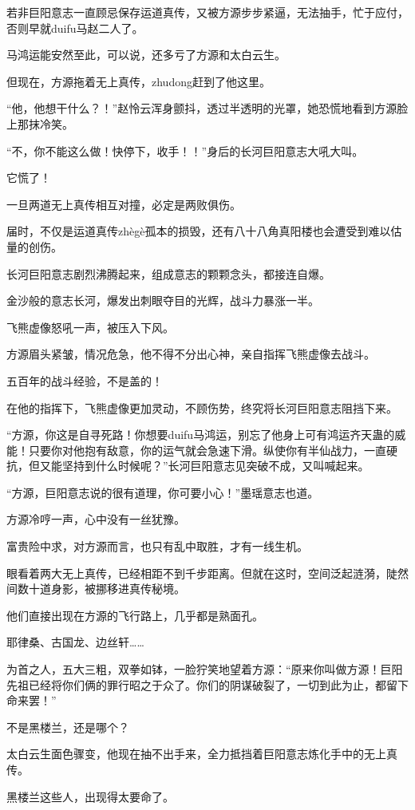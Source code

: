 \begin{this_body}
若非巨阳意志一直顾忌保存运道真传，又被方源步步紧逼，无法抽手，忙于应付，否则早就duifu马赵二人了。

马鸿运能安然至此，可以说，还多亏了方源和太白云生。

但现在，方源拖着无上真传，zhudong赶到了他这里。

“他，他想干什么？！”赵怜云浑身颤抖，透过半透明的光罩，她恐慌地看到方源脸上那抹冷笑。

“不，你不能这么做！快停下，收手！！”身后的长河巨阳意志大吼大叫。

它慌了！

一旦两道无上真传相互对撞，必定是两败俱伤。

届时，不仅是运道真传zhègè孤本的损毁，还有八十八角真阳楼也会遭受到难以估量的创伤。

长河巨阳意志剧烈沸腾起来，组成意志的颗颗念头，都接连自爆。

金沙般的意志长河，爆发出刺眼夺目的光辉，战斗力暴涨一半。

飞熊虚像怒吼一声，被压入下风。

方源眉头紧皱，情况危急，他不得不分出心神，亲自指挥飞熊虚像去战斗。

五百年的战斗经验，不是盖的！

在他的指挥下，飞熊虚像更加灵动，不顾伤势，终究将长河巨阳意志阻挡下来。

“方源，你这是自寻死路！你想要duifu马鸿运，别忘了他身上可有鸿运齐天蛊的威能！只要你对他抱有敌意，你的运气就会急速下滑。纵使你有半仙战力，一直硬抗，但又能坚持到什么时候呢？”长河巨阳意志见突破不成，又叫喊起来。

“方源，巨阳意志说的很有道理，你可要小心！”墨瑶意志也道。

方源冷哼一声，心中没有一丝犹豫。

富贵险中求，对方源而言，也只有乱中取胜，才有一线生机。

眼看着两大无上真传，已经相距不到千步距离。但就在这时，空间泛起涟漪，陡然间数十道身影，被挪移进真传秘境。

他们直接出现在方源的飞行路上，几乎都是熟面孔。

耶律桑、古国龙、边丝轩……

为首之人，五大三粗，双拳如钵，一脸狞笑地望着方源：“原来你叫做方源！巨阳先祖已经将你们俩的罪行昭之于众了。你们的阴谋破裂了，一切到此为止，都留下命来罢！”

不是黑楼兰，还是哪个？

太白云生面色骤变，他现在抽不出手来，全力抵挡着巨阳意志炼化手中的无上真传。

黑楼兰这些人，出现得太要命了。


\end{this_body}
